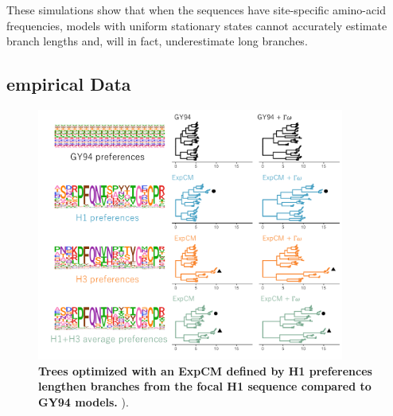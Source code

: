\documentclass[11pt]{article}
\begin{document}
These simulations show that when the sequences have site-specific amino-acid frequencies, models with uniform stationary states cannot accurately estimate branch lengths and, will in fact, underestimate long branches. 	

\subsection*{empirical Data}

\begin{figure}[H]
\centerline{\includegraphics[width=0.9\textwidth]{figures/empirical_trees.pdf}}
\caption{\label{fig:empirical_trees}
\textbf{Trees optimized with an ExpCM defined by H1 preferences lengthen branches from the focal H1 sequence compared to GY94 models.} ).
}
\end{figure}
\end{document}
